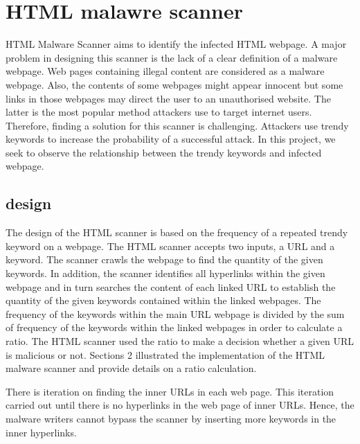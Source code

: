 \section{HTML malawre scanner}

HTML Malware Scanner aims to identify the infected HTML webpage. A major problem in designing this scanner is the lack of a clear definition of a malware webpage. Web pages containing illegal content are considered as a malware webpage. Also, the contents of some webpages might appear innocent but some links in those webpages may direct the user to an unauthorised website. The latter is the most popular method attackers use to target internet users. Therefore, finding a solution for this scanner is challenging. Attackers use trendy keywords to increase the probability of a successful attack. In this project, we seek to observe the relationship between the trendy keywords and infected webpage.

\subsection{design}

The design of the HTML scanner is based on the frequency of a repeated trendy keyword on a webpage. The HTML scanner accepts two inputs, a URL and a keyword. The scanner crawls the webpage to find the quantity of the given keywords. In addition, the scanner identifies all hyperlinks within the given webpage and in turn searches the content of each linked URL to establish the quantity of the given keywords contained within the linked webpages. The frequency of the keywords within the main URL webpage is divided by the sum of frequency of the keywords within the linked webpages in order to calculate a ratio. The HTML scanner used the ratio to make a decision whether a given URL is malicious or not. Sections 2 illustrated the implementation of the HTML malware scanner and provide details on a ratio calculation.

There is iteration on finding the inner URLs in each web page. This iteration carried out until there is no hyperlinks in the web page of inner URLs. Hence, the malware writers cannot bypass the scanner by inserting more keywords in the inner hyperlinks. 
